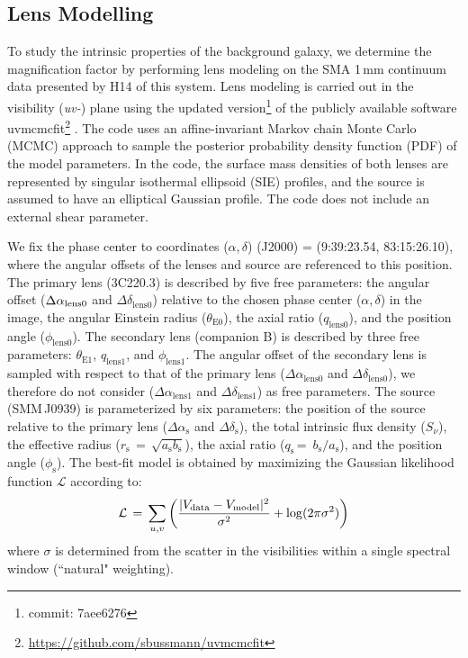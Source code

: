 \documentclass[twocolumn,apj,numberedappendix]{emulateapj}
\begin{document}
\subsection{Lens Modelling} \label{sec:Lens}
To study the intrinsic properties of the background galaxy, we determine the magnification factor by performing
lens modeling on the SMA 1\,mm continuum data presented by H14 of this system. Lens modeling is carried out in the visibility
({\it uv-}) plane using the updated version\footnote{commit: 7aee6276} of the publicly available software {\sc uvmcmcfit}\footnote{\url{https://github.com/sbussmann/uvmcmcfit}}
\citep{Bussmann15a}. The code uses an affine-invariant Markov chain Monte Carlo (MCMC) approach to sample the posterior
probability density function (PDF) of the model parameters. In the code, the surface mass densities of both
lenses are represented by singular isothermal ellipsoid (SIE) profiles, and the source is assumed to have an
elliptical Gaussian profile. The code does not include an external shear parameter.

We fix the phase center to coordinates ($\alpha$,\,$\delta$)\,\,(J2000) = (9:39:23.54,\,\,83:15:26.10), where the
angular offsets of the lenses and source are referenced to this position. The primary lens (3C220.3) is
described by five free parameters: the angular offset ($\Delta \alpha_{\rm
lens0}$ and $\Delta \delta_\textrm{lens0}$) relative to
the chosen phase center ($\alpha$,\,$\delta$) in the image, the angular Einstein radius ($\theta_\textrm{E0}$), the
axial ratio ($q_\textrm{lens0}$), and the position angle ($\phi_\textrm{lens0}$). The secondary lens (companion B) is
described by three free parameters: $\theta_\textrm{E1}$, $q_\textrm{lens1}$, and $\phi_\textrm{lens1}$. The angular offset
of the secondary
lens is sampled with respect to that of
the primary lens ($\Delta \alpha_\textrm{lens0}$ and $\Delta \delta_\textrm{lens0}$), we therefore do not consider ($\Delta \alpha_\textrm{lens1}$ and $\Delta \delta_\textrm{lens1}$)  as free parameters.
The source (SMM\,J0939) is parameterized by
six parameters: the position of the source relative to the
primary lens ($\Delta \alpha_\textrm{s}$ and $\Delta
\delta_\textrm{s}$), the total intrinsic flux density ($S_\nu$), the
effective radius ($r_\textrm{s}\,=\,\sqrt{a_\textrm{s} b_\textrm{s}}$), the axial
ratio ($q_\textrm{s}$\,=\, $b_\textrm{s}/a_\textrm{s}$), and the position angle
($\phi_\textrm{s}$).
The best-fit model is obtained by maximizing the
Gaussian likelihood function $ \mathcal{L} $ according to:
\begin{equation}
    \mathcal{L}\,=\,\sum_{u, v}\left( \frac{|V_\textrm{data} - V_{\rm
    model}|^2}{\sigma^2} + {\rm log}(2 \pi \sigma^2) \right)
\end{equation}
\noindent where $\sigma$ is determined from the scatter in the visibilities within a
single spectral window (``natural" weighting).
\end{document}
